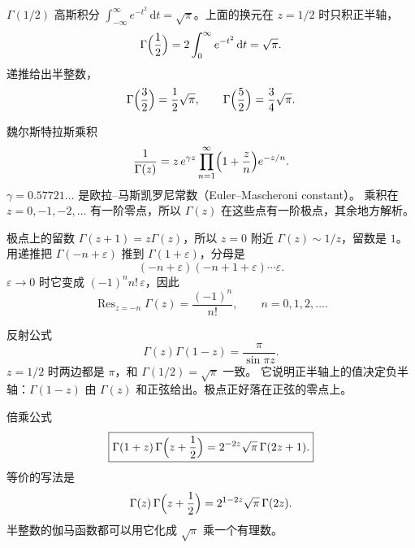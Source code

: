 \documentclass[fontset=windows, chinese, 10pt, xcolor=dvipsnames]{beamer}
\begin{document}
\begin{frame}{$\Gamma(1/2)$}
  高斯积分 $\int_{-\infty}^{\infty}e^{-t^2}\,\mathrm{d}t=\sqrt{\pi}$。上面的换元在 $z=1/2$ 时只积正半轴，
  \[
    \Gamma\Bigl(\frac12\Bigr)
    =2\int_0^{\infty} e^{-t^2}\,\mathrm{d}t
    =\sqrt{\pi}.
  \]
  递推给出半整数，
  \[
    \Gamma\Bigl(\frac32\Bigr)=\frac12\sqrt{\pi},
    \qquad
    \Gamma\Bigl(\frac52\Bigr)=\frac34\sqrt{\pi}.
  \]
\end{frame}

\begin{frame}{魏尔斯特拉斯乘积}
  \[
    \frac{1}{\Gamma(z)}
    =z\,e^{\gamma z}
      \prod_{n=1}^{\infty}\Bigl(1+\frac{z}{n}\Bigr)e^{-z/n}.
  \]
  $\gamma=0.57721\ldots$ 是欧拉--马斯凯罗尼常数（Euler--Mascheroni constant）。
  \vspace{0.4em}
  乘积在 $z=0,-1,-2,\ldots$ 有一阶零点，所以 $\Gamma(z)$ 在这些点有一阶极点，其余地方解析。
\end{frame}

\begin{frame}{极点上的留数}
  $\Gamma(z+1)=z\Gamma(z)$，所以 $z=0$ 附近 $\Gamma(z)\sim 1/z$，留数是 $1$。
  \vspace{0.3em}
  用递推把 $\Gamma(-n+\varepsilon)$ 推到 $\Gamma(1+\varepsilon)$，分母是
  \[
    (-n+\varepsilon)(-n+1+\varepsilon)\cdots\varepsilon.
  \]
  $\varepsilon\to 0$ 时它变成 $(-1)^n n!\,\varepsilon$，因此
  \begin{equation*}
    \operatorname{Res}_{z=-n}\Gamma(z)=\frac{(-1)^n}{n!},
    \qquad n=0,1,2,\ldots.
  \end{equation*}
\end{frame}

\begin{frame}{反射公式}
  \begin{equation*}
    \boxed{\displaystyle
      \Gamma(z)\Gamma(1-z)=\frac{\pi}{\sin\pi z}.}
  \end{equation*}
  $z=1/2$ 时两边都是 $\pi$，和 $\Gamma(1/2)=\sqrt{\pi}$ 一致。
  \vspace{0.35em}
  它说明正半轴上的值决定负半轴：$\Gamma(1-z)$ 由 $\Gamma(z)$ 和正弦给出。极点正好落在正弦的零点上。
\end{frame}

\begin{frame}{倍乘公式}
  \begin{equation*}
    \boxed{\displaystyle
      \Gamma(1+z)\,\Gamma\Bigl(z+\frac12\Bigr)
      =2^{-2z}\sqrt{\pi}\,\Gamma(2z+1).}
  \end{equation*}
  等价的写法是
  \[
    \Gamma(z)\,\Gamma\Bigl(z+\frac12\Bigr)
    =2^{1-2z}\sqrt{\pi}\,\Gamma(2z).
  \]
  半整数的伽马函数都可以用它化成 $\sqrt{\pi}$ 乘一个有理数。
\end{frame}
\end{document}

